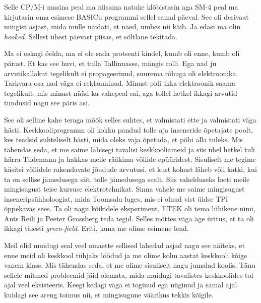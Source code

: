 Selle CP/M-i masina peal ma niisama natuke klõbistasin aga 
SM-4 peal ma 
kirjutasin oma esimese BASICu programmi sellel samal 
päeval. See oli derivaat mingist asjast, mida mulle näidati, et näed, umbes nii 
käib. Ja edasi ma olin \emph{hooked}. Sellest ühest päevast piisas, et sõltlane 
tekitada. 


Ma ei oskagi öelda, ma ei ole sada protsenti kindel, kumb oli enne, kumb oli 
pärast. Et kas see huvi, et tulla Tallinnasse, mängis rolli. Ega nad ju 
arvutikallakut tegelikult ei propageerinud, suurema rõhuga oli  elektroonika. 
Tarkvara osa nad väga ei reklaaminud. Minust pidi ikka elektroonik saama 
tegelikult, mis minust nüüd ka vahepeal sai, aga tollel hetkel ikkagi arvutid 
tundusid nagu see päris asi. 


See oli selline kahe teraga mõõk selles suhtes, et valmistati ette ja 
valmistati väga hästi. Keskkooliprogramm oli kokku pandud 
tolle aja inseneride õpetajate poolt, kes teadsid suhteliselt hästi, mida oleks 
vaja õpetada, et põhi alla tuleks. Mis tähendas seda, et me saime 
läbisegi  tavalisi keskkooliaineid ja siis ühel hetkel tuli härra 
Tiidemann ja hakkas meile rääkima võllide 
epüüridest. Sisuliselt me tegime käsitsi võllidele 
rakendavate jõudude arvutusi, et kust kohast läheb võll katki, kui ta on 
sellise jämedusega siit, tolle jämedusega sealt. Siis vahelduseks loeti meile 
mingisugust teise kursuse elektrotehnikat. Sinna vahele me saime mingisugust 
inseneripsühholoogiat, mida Toomsalu luges, mis ei 
olnud vist üldse TPI õppekavas sees. Ta oli nagu kõikidele eksperiment. 
ETEK  oli tema lühikene nimi, Ants Reili ja 
Peeter Grossberg teda tegid. Selles mõttes 
väga äge üritus, et ta oli ikkagi täiesti \emph{green-field}. Eriti, kuna me 
olime esimene lend. 

Meil olid muidugi seal veel omaette sellised lahedad asjad nagu see näiteks, et 
enne meid oli keskkool tühjaks löödud ja me olime kolm aastat keskkooli kõige 
vanem klass. Mis tähendas seda, et me olime sisuliselt nagu jumalad koolis. 
Tänu sellele mitmed probleemid jäid olemata, mida muidugi tavalistes 
keskkoolides tol ajal veel eksisteeris. Keegi kedagi väga ei toginud ega 
nüginud ja samal ajal kuidagi see areng toimus nii, et mingisugune väärikus 
tekkis kõigile. 

